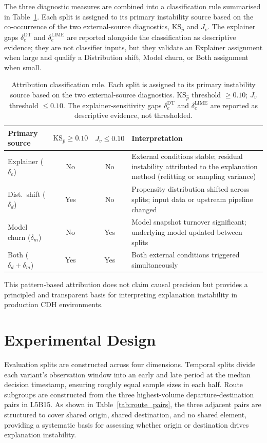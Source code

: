 \documentclass[oneside]{memoir} %
\begin{document}
The three diagnostic measures are combined into a classification rule summarised in Table~\ref{tab:attribution_rule}. Each split is assigned to its primary instability source based on the co-occurrence of the two external-source diagnostics, $\text{KS}_{\hat{p}}$ and $J_v$. The explainer gaps $\delta_e^{\text{DT}}$ and $\delta_e^{\text{LIME}}$ are reported alongside the classification as descriptive evidence; they are not classifier inputs, but they validate an Explainer assignment when large and qualify a Distribution shift, Model churn, or Both assignment when small.

\begin{table}[ht]
\caption{Attribution classification rule. Each split is assigned to its primary instability source based on the two external-source diagnostics. $\text{KS}_{\hat{p}}$ threshold $\geq 0.10$; $J_v$ threshold $\leq 0.10$. The explainer-sensitivity gaps $\delta_e^{\text{DT}}$ and $\delta_e^{\text{LIME}}$ are reported as descriptive evidence, not thresholded.}
\label{tab:attribution_rule}
\centering
\begin{tabular}{lccp{6cm}}
\toprule
Primary source & $\text{KS}_{\hat{p}} \geq 0.10$ & $J_v \leq 0.10$ & Interpretation \\
\midrule
Explainer ($\delta_e$) & No & No & External conditions stable; residual instability attributed to the explanation method (refitting or sampling variance) \\
Dist.\ shift ($\delta_d$) & Yes & No & Propensity distribution shifted across splits; input data or upstream pipeline changed \\
Model churn ($\delta_m$) & No & Yes & Model snapshot turnover significant; underlying model updated between splits \\
Both ($\delta_d + \delta_m$) & Yes & Yes & Both external conditions triggered simultaneously \\
\bottomrule
\end{tabular}
\end{table}

This pattern-based attribution does not claim causal precision but provides a principled and transparent basis for interpreting explanation instability in production CDH environments.

\section{Experimental Design} \label{sec:experimental_design}

Evaluation splits are constructed across four dimensions. Temporal splits divide each variant's observation window into an early and late period at the median decision timestamp, ensuring roughly equal sample sizes in each half. Route subgroups are constructed from the three highest-volume departure-destination pairs in L5B15. As shown in Table~\ref{tab:route_pairs}, the three adjacent pairs are structured to cover shared origin, shared destination, and no shared element, providing a systematic basis for assessing whether origin or destination drives explanation instability.
\end{document}
